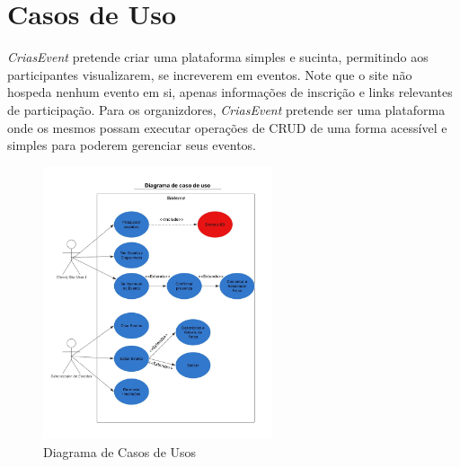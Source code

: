 \section{Casos de Uso}
\textit{CriasEvent} pretende criar uma plataforma simples e sucinta, permitindo aos participantes visualizarem, se increverem em eventos. Note que o site não hospeda nenhum evento em si, apenas informações de inscrição e links relevantes de participação. Para os organizdores, \textit{CriasEvent} pretende ser uma plataforma onde os mesmos possam executar operações de CRUD de uma forma acessível e simples para poderem gerenciar seus eventos.

\begin{figure}[h]
  \centering
  \includegraphics[width=0.6\textwidth]{images/user_case}
  \caption{Diagrama de Casos de Usos}
  \label{fig:diagram_user_case}
\end{figure}

